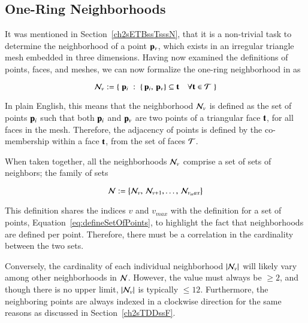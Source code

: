 %
%
%
%
\subsection{One-Ring Neighborhoods}
\label{ch2sTDDssORN}
It was mentioned in Section~\ref{ch2sETBssTsssN}, that it is a non-trivial task to determine the neighborhood of a point $\mathbf{p}_v$, which exists in an irregular triangle mesh embedded in three dimensions. Having now examined the definitions of points, faces, and meshes, we can now formalize the one-ring neighborhood in \tdd{} as

\begin{equation}
	\mathcal{N}_v := \left \{\;\mathbf{p}_i\;:\;\left \{\,\mathbf{p}_i,\,\mathbf{p}_v\right \} \subseteq \mathbf{t} \quad \forall \mathbf{t} \in \mathcal{T}\;\right \}
	\label{eq:defineNeighborhood}
\end{equation}%
%
%

In plain English, this means that the neighborhood $\mathcal{N}_v$ is defined as the set of points $\mathbf{p}_i$ such that both $\mathbf{p}_i$ and $\mathbf{p}_v$ are two points of a triangular face $\mathbf{t}$, for all faces in the mesh. Therefore, the adjacency of points is defined by the co-membership within a face $\mathbf{t}$, from the set of faces $\mathcal{T}$.

When taken together, all the neighborhoods $\mathcal{N}_v$ comprise a set of sets of neighbors; the family of sets

\begin{equation}
	\mathcal{N} := \left \{\mathcal{N}_v,\,\mathcal{N}_{v+1},\ldots,\,\mathcal{N}_{v_max}\right \}
	\label{eq:defineNeighborhood}
\end{equation}%
%

This definition shares the indices $v$ and $v_{max}$ with the definition for a set of points, Equation~\ref{eq:defineSetOfPoints}, to highlight the fact that neighborhoods are defined per point. Therefore, there must be a correlation in the cardinality between the two sets.

Conversely, the cardinality of each individual neighborhood $|\mathcal{N}_v|$ will likely vary among other neighborhoods in $\mathcal{N}$. However, the value must always be $\geq 2$, and though there is no upper limit, $|\mathcal{N}_v|$ is typically $\leq 12$. Furthermore, the neighboring points are always indexed in a clockwise direction for the same reasons as discussed in Section~\ref{ch2sTDDssF}.

